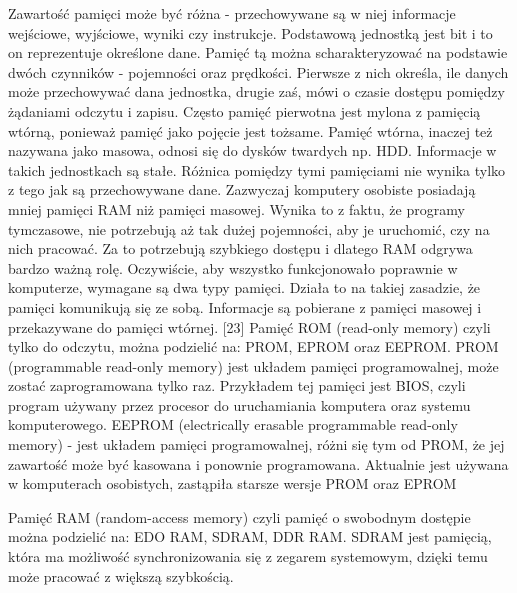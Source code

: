 \documentclass[12pt, a4paper, onside, polish]{article}				%
\begin{document}
 

Zawartość pamięci może być różna - przechowywane są w niej informacje wejściowe, wyjściowe, wyniki czy instrukcje. Podstawową jednostką jest bit i to on reprezentuje określone dane. Pamięć tą można scharakteryzować na podstawie dwóch czynników - pojemności oraz prędkości. Pierwsze z nich określa, ile danych może przechowywać dana jednostka, drugie zaś, mówi o czasie dostępu pomiędzy żądaniami odczytu i zapisu. Często pamięć pierwotna jest mylona z pamięcią wtórną, ponieważ pamięć jako pojęcie jest tożsame. Pamięć wtórna, inaczej też nazywana jako masowa, odnosi się do dysków twardych np. HDD. Informacje w takich jednostkach są stałe. Różnica pomiędzy tymi pamięciami nie wynika tylko z tego jak są przechowywane dane. Zazwyczaj komputery osobiste posiadają mniej pamięci RAM niż pamięci masowej. Wynika to z faktu, że programy tymczasowe, nie potrzebują aż tak dużej pojemności, aby je uruchomić, czy na nich pracować. Za to potrzebują szybkiego dostępu i dlatego RAM odgrywa bardzo ważną rolę. Oczywiście, aby wszystko funkcjonowało poprawnie w komputerze, wymagane są dwa typy pamięci. Działa to na takiej zasadzie, że pamięci komunikują się ze sobą. Informacje są pobierane z pamięci masowej i przekazywane do pamięci wtórnej. [23] 
\newline\newline
Pamięć ROM (read-only memory) czyli tylko do odczytu, można podzielić na: PROM, EPROM oraz EEPROM.  \newline\newline
PROM (programmable read-only memory) jest układem pamięci programowalnej, może zostać zaprogramowana tylko raz. Przykładem tej pamięci jest BIOS, czyli program używany przez procesor do uruchamiania komputera oraz systemu komputerowego. \newline\newline
EEPROM (electrically erasable programmable read-only memory) - jest układem pamięci programowalnej, różni się tym od PROM, że jej zawartość może być kasowana i ponownie programowana. Aktualnie jest używana w komputerach osobistych, zastąpiła starsze wersje PROM oraz EPROM \newline\newline

 
Pamięć RAM (random-access memory) czyli pamięć o swobodnym dostępie można podzielić na: EDO RAM, SDRAM, DDR RAM. \newline\newline
SDRAM jest pamięcią, która ma możliwość synchronizowania się z zegarem systemowym, dzięki temu może pracować z większą szybkością. \newline\newline
\end{document}
